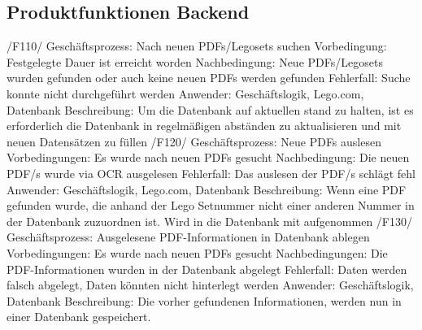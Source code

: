 \subsection{Produktfunktionen Backend} 

/F110/ \newline
Geschäftsprozess: Nach neuen PDFs/Legosets suchen \newline
Vorbedingung: Festgelegte Dauer ist erreicht worden \newline
Nachbedingung: Neue PDFs/Legosets wurden gefunden oder auch keine neuen PDFs werden gefunden \newline
Fehlerfall: Suche konnte nicht durchgeführt werden \newline
Anwender: Geschäftslogik, Lego.com, Datenbank \newline
Beschreibung: Um die Datenbank auf aktuellen stand zu halten, ist es erforderlich die Datenbank in regelmäßigen abständen zu aktualisieren und mit neuen Datensätzen zu füllen \newline \newline
/F120/ \newline
Geschäftsprozess: Neue PDFs auslesen \newline
Vorbedingungen: Es wurde nach neuen PDFs gesucht \newline
Nachbedingung: Die neuen PDF/s wurde via OCR ausgelesen \newline
Fehlerfall: Das auslesen der PDF/s schlägt fehl \newline
Anwender: Geschäftslogik, Lego.com, Datenbank \newline
Beschreibung: Wenn eine PDF gefunden wurde, die anhand der Lego Setnummer nicht einer anderen Nummer in der Datenbank zuzuordnen ist. Wird in die Datenbank mit aufgenommen \newline \newline
/F130/ \newline
Geschäftsprozess: Ausgelesene PDF-Informationen in Datenbank ablegen \newline
Vorbedingungen: Es wurde nach neuen PDFs gesucht \newline
Nachbedingungen: Die PDF-Informationen wurden in der Datenbank abgelegt \newline
Fehlerfall: Daten werden falsch abgelegt, Daten könnten nicht hinterlegt werden \newline
Anwender: Geschäftslogik, Datenbank \newline
Beschreibung: Die vorher gefundenen Informationen, werden nun in einer Datenbank gespeichert. \newline \newline
